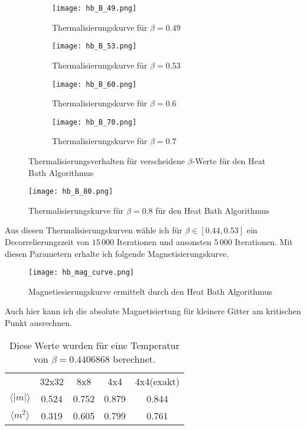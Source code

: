 \documentclass[12pt]{article}
\begin{document}
\begin{figure}[H]
    \hspace*{-1.5cm}
    \begin{subfigure}{0.4\textwidth}
    \texttt{[image: hb\_B\_49.png]}
    \caption{Thermalisierungskurve für $\beta=0.49$}
    \end{subfigure}
    \hfill
    \begin{subfigure}{0.4\textwidth}
    \hspace*{-0.8cm}
    \texttt{[image: hb\_B\_53.png]}
    \caption{Thermalisierungskurve für $\beta=0.53$}
    \end{subfigure}
    \hfill
    \hspace*{-1.5cm}
    \begin{subfigure}{0.4\textwidth}
    \texttt{[image: hb\_B\_60.png]}
    \caption{Thermalisierungskurve für $\beta=0.6$}
    \end{subfigure}
    \hfill
    \begin{subfigure}{0.4\textwidth}
    \hspace*{-0.8cm}
    \texttt{[image: hb\_B\_70.png]}
    \caption{Thermalisierungskurve für $\beta=0.7$}
    \end{subfigure}
    \hfill
    \caption{Thermalisierungsverhalten für verscheidene $\beta$-Werte für den Heat Bath Algorithmus}
    \end{figure}

    \begin{figure}[H]\centering\texttt{[image: hb\_B\_80.png]}\caption{Thermalisierungskurve für $\beta=0.8$ für den Heat Bath Algorithmus}\end{figure}
Aus diesen Thermalisierungskurven wähle ich für $\beta\in[0.44,0.53]$ ein Decorrelierungszeit von $15\,000$ Iterationen und ansonsten $5\,000$ Iterationen. Mit diesen Parametern erhalte ich folgende Magnetisierungskurve.
\begin{figure}[H]\centering\texttt{[image: hb\_mag\_curve.png]}\caption{Magnetiesierungskurve ermittelt durch den Heat Bath Algorithmus}\end{figure}
Auch hier kann ich die absolute Magnetisiertung für kleinere Gitter am kritischen Punkt ausrechnen.

\begin{table}[H]\centering\begin{tabular}{c|c|c|c|c}&32x32&8x8&4x4&4x4(exakt)\\
    $\langle |m| \rangle$&0.524&0.752&0.879&0.844\\
    $\langle m^2 \rangle$&0.319&0.605&0.799&0.761
\end{tabular}\caption{Diese Werte wurden für eine Temperatur von $\beta=0.4406868$ berechnet.}\end{table}
\end{document}
